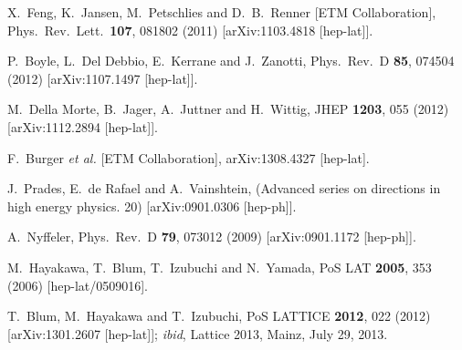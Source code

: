 \begin{thebibliography}{99}
  X.~Feng, K.~Jansen, M.~Petschlies and D.~B.~Renner [ETM Collaboration],
  Phys.\ Rev.\ Lett.\  {\bf 107}, 081802 (2011)
  [arXiv:1103.4818 [hep-lat]].

  P.~Boyle, L.~Del Debbio, E.~Kerrane and J.~Zanotti,
  Phys.\ Rev.\ D {\bf 85}, 074504 (2012)
  [arXiv:1107.1497 [hep-lat]].

  M.~Della Morte, B.~Jager, A.~Juttner and H.~Wittig,
  JHEP {\bf 1203}, 055 (2012)
  [arXiv:1112.2894 [hep-lat]].
  
  F.~Burger {\it et al.} [ETM Collaboration],
  arXiv:1308.4327 [hep-lat].

  J.~Prades, E.~de Rafael and A.~Vainshtein,
  (Advanced series on directions in high energy physics. 20)
  [arXiv:0901.0306 [hep-ph]].

  A.~Nyffeler,
  Phys.\ Rev.\ D {\bf 79}, 073012 (2009)
  [arXiv:0901.1172 [hep-ph]].

  M.~Hayakawa, T.~Blum, T.~Izubuchi and N.~Yamada,
  PoS LAT {\bf 2005}, 353 (2006)
  [hep-lat/0509016].

  T.~Blum, M.~Hayakawa and T.~Izubuchi,
  PoS LATTICE {\bf 2012}, 022 (2012)
  [arXiv:1301.2607 [hep-lat]]; {\it ibid}, Lattice 2013, Mainz, July 29, 2013.


\end{thebibliography}
